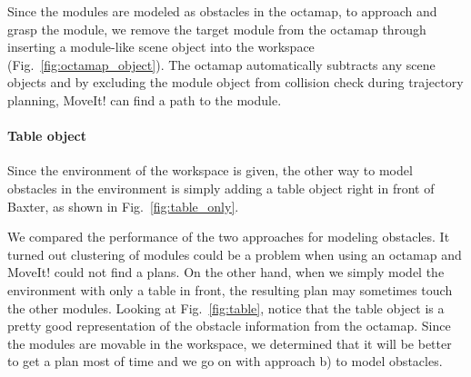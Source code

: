 Since the modules are modeled as obstacles in the octamap, to approach and grasp the module, we remove the target module from the octamap through inserting a module-like scene object into the workspace (Fig.~\ref{fig:octamap_object}). The octamap automatically subtracts any scene objects and by excluding the module object from collision check during trajectory planning, MoveIt! can find a path to the module.

\paragraph{Table object}\label{obstacle-table}
Since the environment of the workspace is given, the other way to model obstacles in the environment is simply adding a table object right in front of Baxter, as shown in Fig.~\ref{fig:table_only}. 

We compared the performance of the two approaches for modeling obstacles. It turned out clustering of modules could be a problem when using an octamap and MoveIt! could not find a plans. On the other hand, when we simply model the environment with only a table in front, the resulting plan may sometimes touch the other modules. Looking at Fig.~\ref{fig:table}, notice that the table object is a pretty good representation of the obstacle information from the octamap. Since the modules are movable in the workspace, we determined that it will be better to get a plan most of time and we go on with approach b) to model obstacles. 


